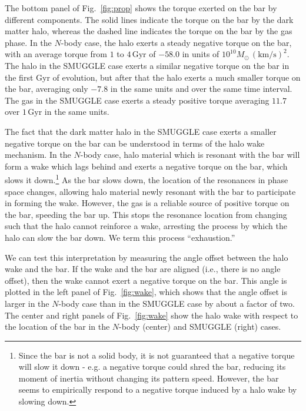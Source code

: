 \documentclass[twoside]{natureprintstyle}
\newcommand{\Nbody}{$N$-body}
\begin{document}
The bottom panel of Fig.~\ref{fig:prop} shows the torque exerted on the bar by
different components. The solid lines indicate the torque on the bar by the
dark matter halo, whereas the dashed line indicates the torque on the bar by
the gas phase. In the \Nbody{} case, the halo exerts a steady negative torque on
the bar, with an average torque from $1$ to $4\,\textrm{Gyr}$ of $-58.0$ in
units of $10^{10}M_{\odot}\,(\textrm{km}/\textrm{s})^2$. The halo in the
SMUGGLE case exerts a similar negative torque on the bar in the first Gyr of
evolution, but after that the halo exerts a much smaller torque on the bar,
averaging only $-7.8$ in the same units and over the same time interval. The gas in
the SMUGGLE case exerts a steady positive torque averaging $11.7$ over $1\,\textrm{Gyr}$ in the same
units.

The fact that the dark matter halo in the SMUGGLE case exerts a smaller
negative torque on the bar can be understood in terms of the halo wake
mechanism. In the \Nbody{} case, halo material which is resonant with the bar
will form a wake which lags behind and exerts a negative torque on the bar,
which slows it down.\cite{1984MNRAS.209..729T, 1985MNRAS.213..451W,
1992ApJ...400...80H}\footnote{Since the bar is not a solid body, it is not
guaranteed that a negative torque will slow it down - e.g. a negative torque
could shred the bar, reducing its moment of inertia without changing its
pattern speed. However, the bar seems to empirically respond to a negative
torque induced by a halo wake by slowing down.} As the bar slows down, the
location of the resonances in phase space changes, allowing halo material
newly resonant with the bar to participate in forming the wake. However, the
gas is a reliable source of positive torque on the bar, speeding the bar up.
This stops the resonance location from changing such that the halo cannot
reinforce a wake, arresting the process by which the halo can slow the bar
down. We term this process ``exhaustion.''

We can test this interpretation by measuring the angle offset between the halo
wake and the bar. If the wake and the bar are aligned (i.e., there is no angle
offset), then the wake cannot exert a negative torque on the bar. This angle
is plotted in the left panel of Fig.~\ref{fig:wake}, which shows that the
angle offset is larger in the \Nbody{} case than in the SMUGGLE case by about a
factor of two. The center and right panels of Fig.~\ref{fig:wake} show the halo
wake with respect to the location of the bar in the \Nbody{} (center) and SMUGGLE
(right) cases.
\end{document}

